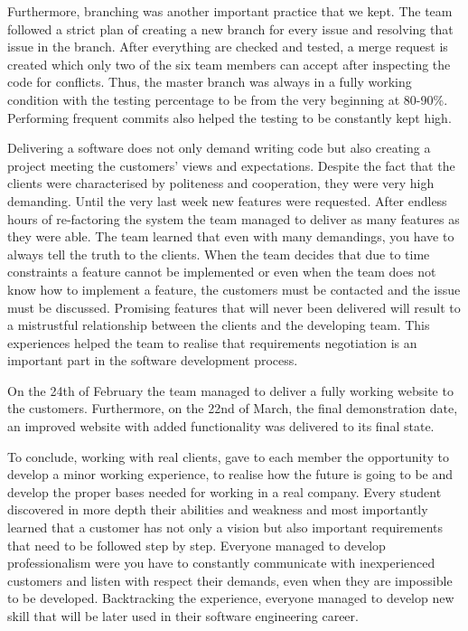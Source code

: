 \documentclass{l3proj}
\begin{document}
Furthermore, branching was another important practice that we kept. The team followed a strict plan of creating a new branch for every issue and resolving that issue in the branch. After everything are checked and tested, a merge request is created which only two of the six team members can accept after inspecting the code for conflicts. Thus, the master branch was always in a fully working condition with the testing percentage to be from the very beginning at 80-90\%. Performing frequent commits also helped the testing to be constantly kept high.

Delivering a software does not only demand writing code but also creating a project meeting the customers' views and expectations. Despite the fact that the clients were characterised by politeness and cooperation, they were very high demanding. Until the very last week new features were requested. After endless hours of re-factoring the system the team managed to deliver as many features as they were able. The team learned that even with many demandings, you have to always tell the truth to the clients. When the team decides that due to time constraints a feature cannot be implemented or even when the team does not know how to implement a feature, the customers must be contacted and the issue must be discussed. Promising features that will never been delivered will result to a mistrustful relationship between the clients and the developing team. This experiences helped the team to realise that requirements negotiation is an important part in the software development process.

On the 24th of February the team managed to deliver a fully working website to the customers. Furthermore, on the 22nd of March, the final demonstration date, an improved website with added functionality was delivered to its final state.

To conclude, working with real clients, gave to each member the opportunity to develop a minor working experience, to realise how the future is going to be and develop the proper bases needed for working in a real company. Every student discovered in more depth their abilities and weakness and most importantly learned that a customer has not only a vision but also important requirements that need to be followed step by step. Everyone managed to develop professionalism were you have to constantly communicate with inexperienced customers and listen with respect their demands, even when they are impossible to be developed. Backtracking the experience, everyone managed to develop new skill that will be later used in their software engineering career.



\newpage


\end{document}
